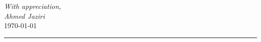 \begin{center}
\begin{minipage}{0.75\textwidth}

\begin{flushright}
\textit{With appreciation,}\\
\textit{Ahmed Jaziri}\\

\textcolor{secondary}{\scriptsize\today}
\end{flushright}

\end{minipage}
\end{center}


\begin{center}
\textcolor{secondary}{\rule{0.3\textwidth}{0.4pt}}
\end{center}

